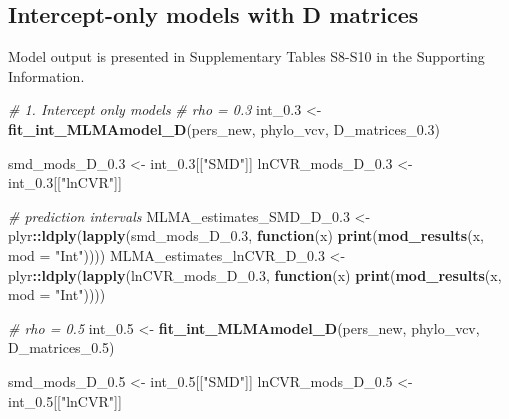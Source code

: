\documentclass[]{article}
\newenvironment{Shaded}{\begin{snugshade}}{\end{snugshade}}
\newcommand{\KeywordTok}[1]{\textcolor[rgb]{0.13,0.29,0.53}{\textbf{#1}}}
\newcommand{\DataTypeTok}[1]{\textcolor[rgb]{0.13,0.29,0.53}{#1}}
\newcommand{\FloatTok}[1]{\textcolor[rgb]{0.00,0.00,0.81}{#1}}
\newcommand{\StringTok}[1]{\textcolor[rgb]{0.31,0.60,0.02}{#1}}
\newcommand{\CommentTok}[1]{\textcolor[rgb]{0.56,0.35,0.01}{\textit{#1}}}
\newcommand{\ControlFlowTok}[1]{\textcolor[rgb]{0.13,0.29,0.53}{\textbf{#1}}}
\newcommand{\OperatorTok}[1]{\textcolor[rgb]{0.81,0.36,0.00}{\textbf{#1}}}
\newcommand{\NormalTok}[1]{#1}
\begin{document}
\subsection{Intercept-only models with D
matrices}\label{intercept-only-models-with-d-matrices}

Model output is presented in Supplementary Tables S8-S10 in the
Supporting Information.

\begin{Shaded}
\begin{Highlighting}[]
\CommentTok{# 1. Intercept only models}
    \CommentTok{# rho = 0.3}
\NormalTok{    int_}\FloatTok{0.3}\NormalTok{ <-}\StringTok{ }\KeywordTok{fit_int_MLMAmodel_D}\NormalTok{(pers_new, phylo_vcv, D_matrices_}\FloatTok{0.3}\NormalTok{)}
    
\NormalTok{    smd_mods_D_}\FloatTok{0.3}\NormalTok{ <-}\StringTok{ }\NormalTok{int_}\FloatTok{0.3}\NormalTok{[[}\StringTok{"SMD"}\NormalTok{]] }
\NormalTok{    lnCVR_mods_D_}\FloatTok{0.3}\NormalTok{ <-}\StringTok{ }\NormalTok{int_}\FloatTok{0.3}\NormalTok{[[}\StringTok{"lnCVR"}\NormalTok{]] }
  
   \CommentTok{# prediction intervals}
\NormalTok{    MLMA_estimates_SMD_D_}\FloatTok{0.3}\NormalTok{ <-}\StringTok{ }\NormalTok{plyr}\OperatorTok{::}\KeywordTok{ldply}\NormalTok{(}\KeywordTok{lapply}\NormalTok{(smd_mods_D_}\FloatTok{0.3}\NormalTok{, }
                           \ControlFlowTok{function}\NormalTok{(x) }\KeywordTok{print}\NormalTok{(}\KeywordTok{mod_results}\NormalTok{(x, }\DataTypeTok{mod =} \StringTok{"Int"}\NormalTok{)))) }
\NormalTok{    MLMA_estimates_lnCVR_D_}\FloatTok{0.3}\NormalTok{ <-}\StringTok{ }\NormalTok{plyr}\OperatorTok{::}\KeywordTok{ldply}\NormalTok{(}\KeywordTok{lapply}\NormalTok{(lnCVR_mods_D_}\FloatTok{0.3}\NormalTok{, }
                              \ControlFlowTok{function}\NormalTok{(x) }\KeywordTok{print}\NormalTok{(}\KeywordTok{mod_results}\NormalTok{(x, }\DataTypeTok{mod =} \StringTok{"Int"}\NormalTok{))))   }

    \CommentTok{# rho = 0.5}
\NormalTok{    int_}\FloatTok{0.5}\NormalTok{ <-}\StringTok{ }\KeywordTok{fit_int_MLMAmodel_D}\NormalTok{(pers_new, phylo_vcv, D_matrices_}\FloatTok{0.5}\NormalTok{)}
    
\NormalTok{    smd_mods_D_}\FloatTok{0.5}\NormalTok{ <-}\StringTok{ }\NormalTok{int_}\FloatTok{0.5}\NormalTok{[[}\StringTok{"SMD"}\NormalTok{]] }
\NormalTok{    lnCVR_mods_D_}\FloatTok{0.5}\NormalTok{ <-}\StringTok{ }\NormalTok{int_}\FloatTok{0.5}\NormalTok{[[}\StringTok{"lnCVR"}\NormalTok{]] }
  

\end{Highlighting}
\end{Shaded}
\end{document}
